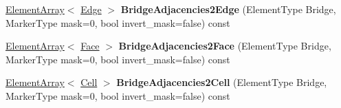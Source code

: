 \begin{DoxyCompactItemize}
\item 
\hypertarget{classINMOST_1_1Element_aa12ffe96df6a43e20a625055898eba2c}{\hyperlink{classINMOST_1_1ElementArray}{Element\-Array}$<$ \hyperlink{classINMOST_1_1Edge}{Edge} $>$ {\bfseries Bridge\-Adjacencies2\-Edge} (Element\-Type Bridge, Marker\-Type mask=0, bool invert\-\_\-mask=false) const }\label{classINMOST_1_1Element_aa12ffe96df6a43e20a625055898eba2c}

\item 
\hypertarget{classINMOST_1_1Element_a31a0168a9eed7aa4c681e45c64b74482}{\hyperlink{classINMOST_1_1ElementArray}{Element\-Array}$<$ \hyperlink{classINMOST_1_1Face}{Face} $>$ {\bfseries Bridge\-Adjacencies2\-Face} (Element\-Type Bridge, Marker\-Type mask=0, bool invert\-\_\-mask=false) const }\label{classINMOST_1_1Element_a31a0168a9eed7aa4c681e45c64b74482}

\item 
\hypertarget{classINMOST_1_1Element_a50326950387636932804bb474cc08bce}{\hyperlink{classINMOST_1_1ElementArray}{Element\-Array}$<$ \hyperlink{classINMOST_1_1Cell}{Cell} $>$ {\bfseries Bridge\-Adjacencies2\-Cell} (Element\-Type Bridge, Marker\-Type mask=0, bool invert\-\_\-mask=false) const }\label{classINMOST_1_1Element_a50326950387636932804bb474cc08bce}


\end{DoxyCompactItemize}
